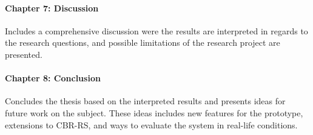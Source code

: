 \paragraph{Chapter 7: Discussion}
Includes a comprehensive discussion were the results are interpreted in regards to the research questions, and possible limitations of the research project are presented.

\paragraph{Chapter 8: Conclusion}
Concludes the thesis based on the interpreted results and presents ideas for future work on the subject. These ideas includes new features for the prototype, extensions to CBR-RS, and ways to evaluate the system in real-life conditions. 


\cleardoublepage